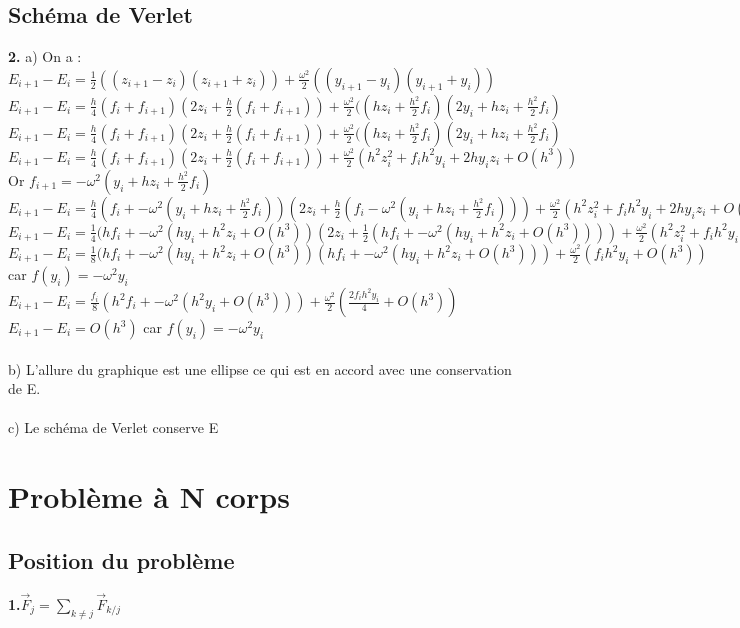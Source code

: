 \documentclass{article}
\begin{document}
\subsection{Schéma de Verlet}

{\bf 2.} a) On a : \\
$E_{i+1}-E_i =\frac{1}{2} ((z_{i+1} -z_i) (z_{i+1} +z_i)) + \frac{\omega^2}{2}((y_{i+1}-y_i)(y_{i+1}+y_i)) $ \\
$E_{i+1}-E_i =\frac{h}{4}(f_i + f_{i+1})(2z_i +\frac{h}{2}(f_i+f_{i+1})) + \frac{\omega^2}{2}((hz_i + \frac{h^2}{2}f_i)(2y_i+hz_i + \frac{h^2}{2}f_i)$ \\
$E_{i+1}-E_i =\frac{h}{4}(f_i + f_{i+1})(2z_i +\frac{h}{2}(f_i+f_{i+1})) + \frac{\omega^2}{2}((hz_i + \frac{h^2}{2}f_i)(2y_i+hz_i + \frac{h^2}{2}f_i)$ \\
$E_{i+1}-E_i =\frac{h}{4}(f_i + f_{i+1})(2z_i +\frac{h}{2}(f_i+f_{i+1})) + \frac{\omega^2}{2}(h^2z_i^2+f_ih^2y_i+2hy_iz_i +O(h^3))$ \\
Or $f_{i+1}=-\omega^2(y_i+hz_i+\frac{h^2}{2}f_i)$ \\
$E_{i+1}-E_i =\frac{h}{4}(f_i + -\omega^2(y_i+hz_i+\frac{h^2}{2}f_i))(2z_i +\frac{h}{2}(f_i-\omega^2(y_i+hz_i+\frac{h^2}{2}f_i))) + \frac{\omega^2}{2}(h^2z_i^2+f_ih^2y_i+2hy_iz_i +O(h^3))$ \\
$E_{i+1}-E_i =\frac{1}{4}(hf_i + -\omega^2(hy_i+h^2z_i+ O(h^3))(2z_i +\frac{1}{2}(hf_i+-\omega^2(hy_i+h^ 2z_i+ O(h^3)))) + \frac{\omega^2}{2}(h^2z_i^2+f_ih^2y_i+2hy_iz_i +O(h^3))$ \\
$E_{i+1}-E_i =\frac{1}{8}(hf_i + -\omega^2(hy_i+h^2z_i+ O(h^3))(hf_i+-\omega^2(hy_i+h^ 2z_i+ O(h^3))) + \frac{\omega^2}{2}(f_ih^2y_i+O(h^3))$ car $f(y_i)=-\omega^2 y_i$ \\
$E_{i+1}-E_i = \frac{f_i}{8}(h^2f_i+-\omega^2(h^2y_i+O(h^3))) + \frac{\omega^2}{2}(\frac{2f_ih^2y_i}{4}+O(h^3))$ \\
$E_{i+1}-E_i=O(h^3)$ car $f(y_i)=-\omega^2y_i$ \\
 \\
b) L'allure du graphique est une ellipse ce qui est en accord avec une conservation de E. \\
 \\
c) Le schéma de Verlet conserve E
\newpage
\section{Problème à N corps}
\subsection{Position du problème}
{\bf 1.}$\vec F_j= \sum_{k \neq j} \vec F_{k/j}$

\end{document}
